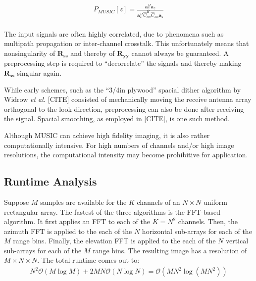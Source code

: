 \begin{align}
    P_{MUSIC}[z] = \frac{\mathbf{a}_z^H \mathbf{a}_z}{\mathbf{a}_z^H\hat C_{nn}^H\hat C_{nn}\mathbf{a}_z}
\end{align} \\

The input signals are often highly correlated, due to phenomena such as multipath propagation or inter-channel crosstalk.
This unfortunately means that nonsingularity of $\mathbf{R_{ss}}$ and thereby of  $\mathbf{R_{yy}}$ cannot always be guaranteed.
A preprocessing step is required to ``decorrelate'' the signals and thereby making $\mathbf{R_{ss}}$ singular again.

While early schemes, such as the ``3/4in plywood'' spacial dither algorithm by Widrow \textit{et al.} [CITE]
consisted of mechanically moving the receive antenna array orthogonal to the look direction,
preprocessing can also be done after receiving the signal. Spacial smoothing, as employed in [CITE], is one such method.

Although MUSIC can achieve high fidelity imaging,
it is also rather computationally intensive.
For high numbers of channels and/or high image resolutions,
the computational intensity may become prohibitive for application.

\subsection{Runtime Analysis}
Suppose $M$ samples are available for the $K$ channels of an $N\times N$ uniform rectangular array.
The fastest of the three algorithms is the FFT-based algorithm.
It first applies an FFT to each of the $K=N^2$ channels.
Then, the azimuth FFT is applied to the each of the $N$ horizontal sub-arrays for each of the $M$ range bins.
Finally, the elevation FFT is applied to the each of the $N$ vertical sub-arrays for each of the $M$ range bins.
The resulting image has a resolution of $M \times N \times N$.
The total runtime comes out to:
\begin{align}
    N^2 \mathcal O(M \log M) + 2MN \mathcal O(N \log N) = \mathcal O \left(MN^2\log (MN^2) \right)
\end{align}


